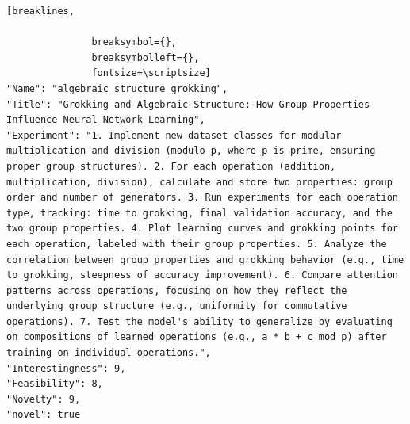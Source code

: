\begin{tcolorbox}[
  breakable,
  colback  = blue!5!white,
  colframe = blue!75!black,
  title    = {Idea 21/50 - \texttt{algebraic\_structure\_grokking}},
  fontupper=\scriptsize\ttfamily,
]
\begin{Verbatim}[breaklines,

               breaksymbol={},
               breaksymbolleft={},
               fontsize=\scriptsize]
"Name": "algebraic_structure_grokking",
"Title": "Grokking and Algebraic Structure: How Group Properties Influence Neural Network Learning",
"Experiment": "1. Implement new dataset classes for modular multiplication and division (modulo p, where p is prime, ensuring proper group structures). 2. For each operation (addition, multiplication, division), calculate and store two properties: group order and number of generators. 3. Run experiments for each operation type, tracking: time to grokking, final validation accuracy, and the two group properties. 4. Plot learning curves and grokking points for each operation, labeled with their group properties. 5. Analyze the correlation between group properties and grokking behavior (e.g., time to grokking, steepness of accuracy improvement). 6. Compare attention patterns across operations, focusing on how they reflect the underlying group structure (e.g., uniformity for commutative operations). 7. Test the model's ability to generalize by evaluating on compositions of learned operations (e.g., a * b + c mod p) after training on individual operations.",
"Interestingness": 9,
"Feasibility": 8,
"Novelty": 9,
"novel": true
\end{Verbatim}
\end{tcolorbox}


